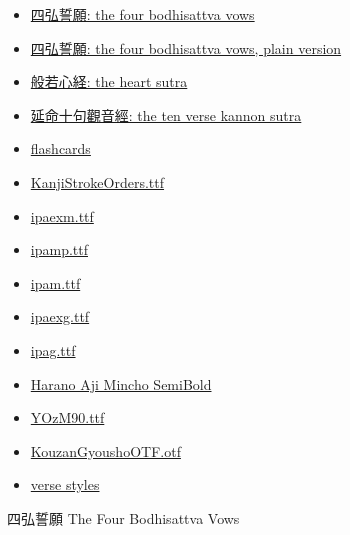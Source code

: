 \documentclass[letterpaper]{article}
\begin{document}
	\vspace*{1cm}
	
	\begin{itemize}
		\item[] \href{https://gwmatthews.github.io/the-four-vows.pdf}{四弘誓願: the four bodhisattva vows}
		\item[] \href{https://gwmatthews.github.io/the-four-vows-plain.pdf}{四弘誓願: the four bodhisattva vows, plain version}
		\item[] \href{https://gwmatthews.github.io/the-heart-sutra.pdf}{般若心経: the heart sutra}
		\item[] \href{https://gwmatthews.github.io/kanzeon.pdf}{延命十句觀音經: the ten verse kannon sutra}
		\item[] \href{https://gwmatthews.github.io/leeches-cards.pdf}{flashcards}
		\item[] \href{https://gwmatthews.github.io/examples/stroke-order.pdf}{KanjiStrokeOrders.ttf}
		\item[] \href{https://gwmatthews.github.io/examples/ipaexm.pdf}{ipaexm.ttf}
		\item[] \href{https://gwmatthews.github.io/examples/ipamp.pdf}{ipamp.ttf}
		\item[] 
			\href{https://gwmatthews.github.io/examples/ipam.pdf}{ipam.ttf}
		\item[] \href{https://gwmatthews.github.io/examples/ipaexg.pdf}{ipaexg.ttf}
		\item[] 
			\href{https://gwmatthews.github.io/examples/ipag.pdf}{ipag.ttf}
		\item[] \href{https://gwmatthews.github.io/examples/HaranoAjiMinchoSB.pdf}{Harano Aji Mincho SemiBold}
		\item[] \href{https://gwmatthews.github.io/examples/YOzM90.pdf}{YOzM90.ttf}
		\item[] \href{https://gwmatthews.github.io/examples/KouzanGyousho.pdf}{KouzanGyoushoOTF.otf}
		\item[] \href{https://gwmatthews.github.io/examples/verse-test.pdf}{verse styles}
		
\end{itemize}

\vfill\eject\pagebreak
{}
\centering 四弘誓願 The Four Bodhisattva Vows
\end{document}
